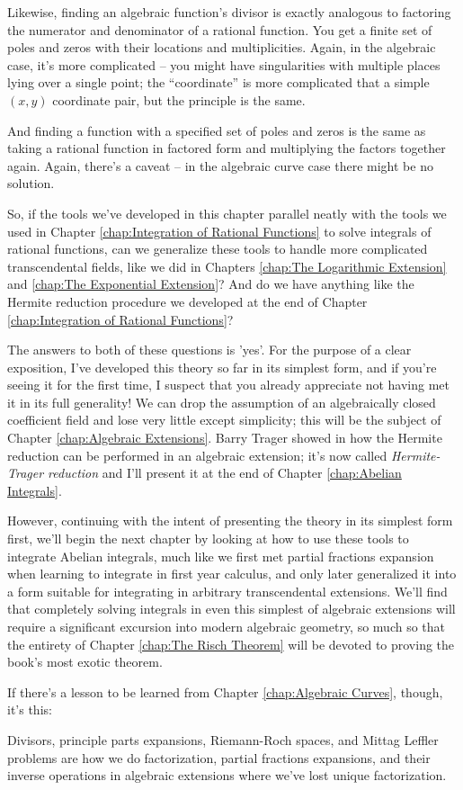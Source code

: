 Likewise, finding an algebraic function's divisor is exactly analogous
to factoring the numerator and denominator of a rational function.
You get a finite set of poles and zeros with their locations and
multiplicities.  Again, in the algebraic case, it's more complicated --
you might have singularities with multiple places lying over a single
point; the ``coordinate'' is more complicated that a simple $(x,y)$
coordinate pair, but the principle is the same.

And finding a function with a specified set of poles and zeros is the
same as taking a rational function in factored form and multiplying
the factors together again.  Again, there's a caveat -- in the
algebraic curve case there might be no solution.

So, if the tools we've developed in this chapter parallel neatly with
the tools we used in Chapter \ref{chap:Integration of Rational Functions} to solve integrals of rational
functions, can we generalize these tools to handle more complicated
transcendental fields, like we did in Chapters \ref{chap:The Logarithmic Extension} and \ref{chap:The Exponential Extension}?
And do we have anything like the Hermite reduction procedure we developed at the
end of Chapter \ref{chap:Integration of Rational Functions}?

The answers to both of these questions is 'yes'.  For the purpose of a
clear exposition, I've developed this theory so far in its simplest
form, and if you're seeing it for the first time, I suspect that you
already appreciate not having met it in its full generality!  We can
drop the assumption of an algebraically closed coefficient field and
lose very little except simplicity; this will be the subject of
Chapter \ref{chap:Algebraic Extensions}.  Barry Trager showed in \cite{trager} how the Hermite
reduction can be performed in an algebraic extension; it's now called
{\it Hermite-Trager reduction} and I'll present it at the end of
Chapter \ref{chap:Abelian Integrals}.

However, continuing with the intent of presenting the theory in its
simplest form first, we'll begin the next chapter by looking at how to
use these tools to integrate Abelian integrals, much like we first met
partial fractions expansion when learning to integrate in first year
calculus, and only later generalized it into a form suitable for
integrating in arbitrary transcendental extensions.  We'll find that
completely solving integrals in even this simplest of algebraic
extensions will require a significant excursion into modern algebraic
geometry, so much so that the entirety of Chapter \ref{chap:The Risch Theorem}
will be devoted to proving the book's most exotic theorem.

If there's a lesson to be learned from Chapter \ref{chap:Algebraic Curves}, though, it's this:

\begin{key point}
Divisors, principle parts expansions, Riemann-Roch spaces, and Mittag
Leffler problems are how we do factorization, partial fractions
expansions, and their inverse operations in algebraic extensions where
we've lost unique factorization.
\end{key point}
